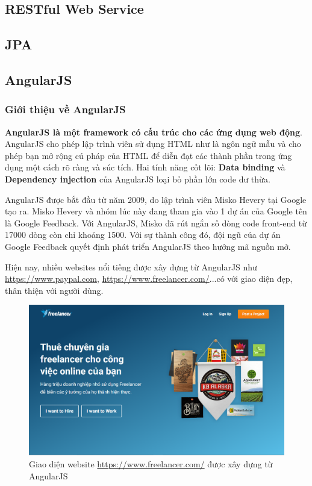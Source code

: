 \documentclass[a4paper]{article}
\begin{document}
\subsection{RESTful Web Service}
\subsection{JPA}
\subsection{AngularJS}
\subsubsection{Giới thiệu về AngularJS}
\textbf{AngularJS là một framework có cấu trúc cho các ứng dụng web động}. AngularJS cho phép lập trình viên sử dụng HTML như là ngôn ngữ mẫu và cho phép bạn mở rộng cú pháp của HTML để diễn đạt các thành phần trong ứng dụng một cách rõ ràng và súc tích. Hai tính năng cốt lõi: \textbf{Data binding} và \textbf{Dependency injection} của AngularJS loại bỏ phần lớn code dư thừa.

AngularJS được bắt đầu từ năm 2009, do lập trình viên Misko Hevery tại Google tạo ra. Misko Hevery và nhóm lúc này đang tham gia vào 1 dự án của Google tên là Google Feedback. Với AngularJS, Misko đã rút ngắn số dòng code front-end từ 17000 dòng còn chỉ khoảng 1500. Với sự thành công đó, đội ngũ của dự án Google Feedback quyết định phát triển AngularJS theo hướng mã nguồn mở.

Hiện nay, nhiều websites nổi tiếng được xây dựng từ AngularJS như \url{https://www.paypal.com}, \url{https://www.freelancer.com/}...có với giao diện đẹp, thân thiện với người dùng.
\begin{center}
    \begin{figure}[h]
    \begin{center}
     \includegraphics[scale=.3]{freelancer.PNG}
    \end{center}
    \caption{Giao diện website \url{https://www.freelancer.com/} được xây dựng từ AngularJS}
    \label{refhinh2}
    \end{figure}
\end{center}
\end{document}

